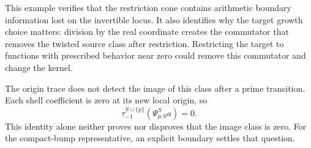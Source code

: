 \documentclass[11pt,letterpaper]{article}
\theoremstyle{definition}
\theoremstyle{remark}
\begin{document}
This example verifies that the restriction cone contains
arithmetic boundary information lost on the invertible locus.
It also identifies why the target growth choice matters:
division by the real coordinate creates the commutator that
removes the twisted source class after restriction. Restricting
the target to functions with prescribed behavior near zero
could remove this commutator and change the kernel.

The origin trace does not detect the image of this class after
a prime transition. Each shell coefficient is zero at its
new local origin, so
\begin{equation}
 \tau_{-1}^{S\cup\{p\}}(\Psi_{p,0}^Sa)=0.
 \label{eq:trace-shell-zero}
\end{equation}
This identity alone neither proves nor disproves that the
image class is zero. For the compact-bump representative, an
explicit boundary settles that question.
\end{document}
